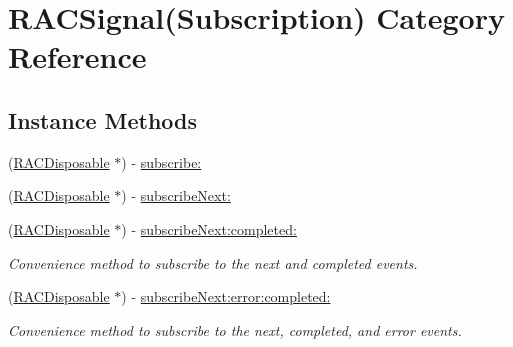 \hypertarget{category_r_a_c_signal_07_subscription_08}{}\section{R\+A\+C\+Signal(Subscription) Category Reference}
\label{category_r_a_c_signal_07_subscription_08}
\subsection*{Instance Methods}
\begin{DoxyCompactItemize}
\item 
(\mbox{\hyperlink{interface_r_a_c_disposable}{R\+A\+C\+Disposable}} $\ast$) -\/ \mbox{\hyperlink{category_r_a_c_signal_07_subscription_08_aeab76d632d98bbc321ec5e19575377eb}{subscribe\+:}}
\item 
(\mbox{\hyperlink{interface_r_a_c_disposable}{R\+A\+C\+Disposable}} $\ast$) -\/ \mbox{\hyperlink{category_r_a_c_signal_07_subscription_08_a50d000f05e61411c438e616475deb7f8}{subscribe\+Next\+:}}
\item 
\mbox{\label{category_r_a_c_signal_07_subscription_08_afa988fdb4bcfe4d9b7b944879d163a52}} 
(\mbox{\hyperlink{interface_r_a_c_disposable}{R\+A\+C\+Disposable}} $\ast$) -\/ \mbox{\hyperlink{category_r_a_c_signal_07_subscription_08_afa988fdb4bcfe4d9b7b944879d163a52}{subscribe\+Next\+:completed\+:}}
\begin{DoxyCompactList}\small\item\em Convenience method to subscribe to the {\ttfamily next} and {\ttfamily completed} events. \end{DoxyCompactList}\item 
\mbox{\label{category_r_a_c_signal_07_subscription_08_a50b7b51715316c5da372cc0cf96039f6}} 
(\mbox{\hyperlink{interface_r_a_c_disposable}{R\+A\+C\+Disposable}} $\ast$) -\/ \mbox{\hyperlink{category_r_a_c_signal_07_subscription_08_a50b7b51715316c5da372cc0cf96039f6}{subscribe\+Next\+:error\+:completed\+:}}
\begin{DoxyCompactList}\small\item\em Convenience method to subscribe to the {\ttfamily next}, {\ttfamily completed}, and {\ttfamily error} events. \end{DoxyCompactList}\item 

\end{DoxyCompactItemize}
